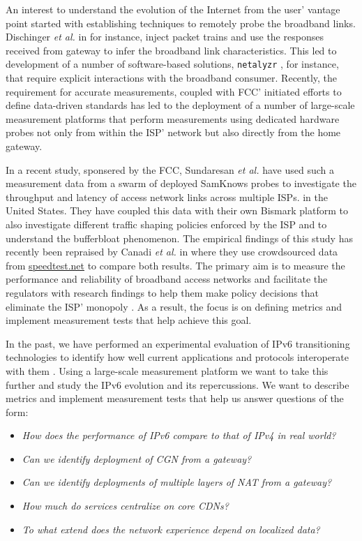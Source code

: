An interest to understand the evolution of the Internet from the user' vantage
point started with establishing techniques to remotely probe the broadband
links. Dischinger \emph{et al.} in \cite{dischinger:2007} for instance, inject
packet trains and use the responses received from gateway to infer the
broadband link characteristics. This led to development of a number of
software-based solutions, \texttt{netalyzr} \cite{kreibich:2010}, for
instance, that require explicit interactions with the broadband consumer.
Recently, the requirement for accurate measurements, coupled with \ac{FCC}'
initiated efforts to define data-driven standards has led to the deployment of
a number of large-scale measurement platforms that perform measurements using
dedicated hardware probes not only from within the ISP' network but also
directly from the home gateway. 

In a recent study, sponsered by the \ac{FCC}, Sundaresan \emph{et al.}
\cite{sundaresan:2011} have used such a measurement data from a swarm of
deployed SamKnows probes to investigate the throughput and latency of access
network links across multiple ISPs. in the United States. They have coupled
this data with their own Bismark platform \cite{sundaresan:2012} to also
investigate different traffic shaping policies enforced by the ISP and to
understand the bufferbloat phenomenon. The empirical findings of this study
has recently been repraised by Canadi \emph{et al.} in \cite{canadi:2012}
where they use crowdsourced data from \url{speedtest.net} to compare both
results. The primary aim is to measure the performance and reliability of
broadband access networks and facilitate the regulators with research findings
to help them make policy decisions that eliminate the ISP' monopoly
\cite{draft-schulzrinne-lmap-requirements-00}.  As a result, the focus is on
defining metrics and implement measurement tests that help achieve this goal.

In the past, we have performed an experimental evaluation of IPv6
transitioning technologies to identify how well current applications and
protocols interoperate with them \cite{vbajpai:2012}. Using a large-scale
measurement platform we want to take this further and study the IPv6 evolution
and its repercussions. We want to describe metrics and implement measurement
tests that help us answer questions of the form:

\begin{itemize}
  \item \emph{How does the performance of IPv6 compare to that of IPv4 in real world?}
  \item \emph{Can we identify deployment of \ac{CGN} from a gateway?}
  \item \emph{Can we identify deployments of multiple layers of NAT from a gateway?}
  \item \emph{How much do services centralize on core \ac{CDN}s?}
  \item \emph{To what extend does the network experience depend on
              localized data?}
\end{itemize}

